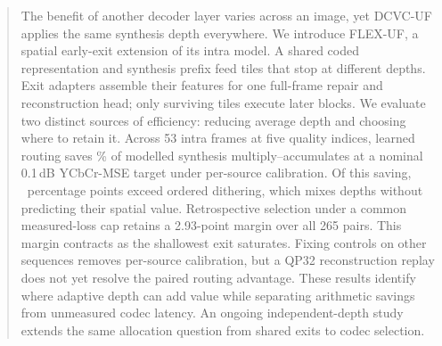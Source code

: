 \begin{abstract}
The benefit of another decoder layer varies across an image, yet DCVC-UF
applies the same synthesis depth everywhere. We introduce FLEX-UF, a
spatial early-exit extension of its intra model. A shared coded
representation and synthesis prefix feed tiles that stop at different
depths. Exit adapters assemble their features for one full-frame repair
and reconstruction head; only surviving tiles execute later blocks.
We evaluate two distinct sources of efficiency: reducing average depth
and choosing where to retain it. Across 53 intra frames at five quality
indices, learned routing saves \MainRouterSaving\% of modelled synthesis
multiply--accumulates at a nominal 0.1\,dB YCbCr-MSE target under
per-source calibration. Of this saving, \MainPremium\ percentage points
exceed ordered dithering, which mixes depths without predicting their
spatial value. Retrospective selection under a common measured-loss cap
retains a 2.93-point margin over all 265 pairs. This margin contracts as
the shallowest exit saturates. Fixing controls on other sequences removes
per-source calibration, but a QP32 reconstruction replay does not yet
resolve the paired routing advantage. These results identify where
adaptive depth can add value while separating arithmetic savings from
unmeasured codec latency. An ongoing independent-depth study extends
the same allocation question from shared exits to codec selection.
\end{abstract}
